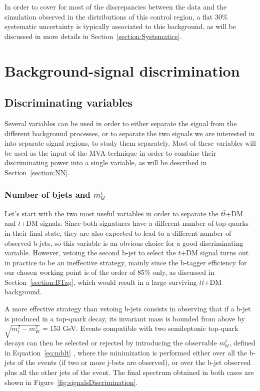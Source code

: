 \documentclass[a4paper, 10pt, openright]{report}
\begin{document}
In order to cover for most of the discrepancies between the data and the simulation observed in the distributions of this control region, a flat 30\% systematic uncertainty is typically associated to this background, as will be discussed in more details in Section~\ref{section:Systematics}.

\section{Background-signal discrimination} \label{section:Discrimination}
\subsection{Discriminating variables}

Several variables can be used in order to either separate the signal from the different background processes, or to separate the two signals we are interested in into separate signal regions, to study them separately. Most of these variables will be used as the input of the \ac{MVA} technique in order to combine their discriminating power into a single variable, as will be described in Section~\ref{section:NN}.

\subsubsection*{Number of bjets and $m_{bl}^t$}

Let's start with the two most useful variables in order to separate the $t \bar t$+DM and $t$+DM signals. Since both signatures have a different number of top quarks in their final state, they are also expected to lead to a different number of observed b-jets, so this variable is an obvious choice for a good discriminating variable. However, vetoing the second b-jet to select the $t$+DM signal turns out in practice to be an ineffective strategy, mainly since the b-tagger efficiency for our chosen working point is of the order of 85\% only, as discussed in Section~\ref{section:BTag}, which would result in a large surviving $t \bar t$+DM background.

A more effective strategy than vetoing b-jets consists in observing that if a b-jet is produced in a top-quark decay, its invariant mass is bounded from above by $\sqrt{m_t^2 - m_{W}^2} = 153$ GeV. Events compatible with two semileptonic top-quark decays can then be selected or rejected by introducing the observable $m_{bl}^t$, defined in Equation~\ref{eq:mblt} \cite{mblt}, where the minimization is performed either over all the b-jets of the events (if two or more j-bets are observed), or over the b-jet observed plus all the other jets of the event. The final spectrum obtained in both cases are shown in Figure~\ref{fig:signalsDiscrimination}.
\end{document}
